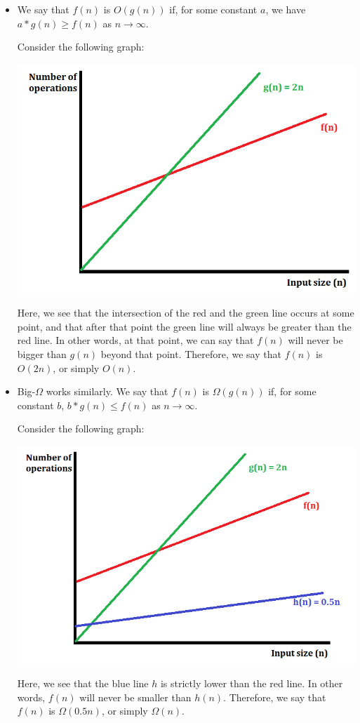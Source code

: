 \documentclass[letterpaper]{article}
\begin{document}
\begin{itemize}
    \item We say that $f(n)$ is $O(g(n))$ if, for some constant $a$, we have $a * g(n) \geq f(n)$ as $n \to \infty$. 
    
    \bigskip 

    Consider the following graph: 
    \begin{center}
        \includegraphics[scale=0.5]{img/graph2.PNG}
    \end{center}
    Here, we see that the intersection of the red and the green line occurs at some point, and that after that point the green line will always be greater than the red line. In other words, at that point, we can say that $f(n)$ will never be bigger than $g(n)$ beyond that point. Therefore, we say that $f(n)$ is $O(2n)$, or simply $O(n)$.
    
    \item Big-$\Omega$ works similarly. We say that $f(n)$ is $\Omega(g(n))$ if, for some constant $b$, $b * g(n) \leq f(n)$ as $n \to \infty$.
    
    \bigskip 

    Consider the following graph: 
    \begin{center}
        \includegraphics[scale=0.5]{img/graph3.PNG}
    \end{center}
    Here, we see that the blue line $h$ is strictly lower than the red line. In other words, $f(n)$ will never be smaller than $h(n)$. Therefore, we say that $f(n)$ is $\Omega(0.5n)$, or simply $\Omega(n)$. 
    

\end{itemize}
\end{document}
